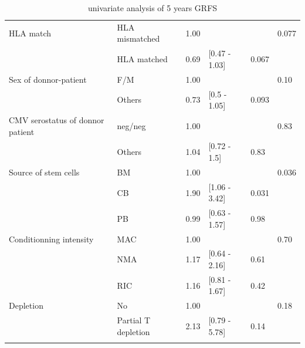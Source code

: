 \documentclass[a4paper,11pt] {article}
\begin{document}
\begin{center}
\begin{landscape}
\begin{longtable}{llrlll}
  HLA match & HLA mismatched & 1.00 &  &  & 0.077 \\ 
   & HLA matched & 0.69 & [0.47 - 1.03] & 0.067 &  \\ 
  Sex of donnor-patient & F/M & 1.00 &  &  & 0.10 \\ 
   & Others & 0.73 & [0.5 - 1.05] & 0.093 &  \\ 
  CMV serostatus of donnor patient & neg/neg & 1.00 &  &  & 0.83 \\ 
   & Others & 1.04 & [0.72 - 1.5] & 0.83 &  \\ 
  Source of stem cells & BM & 1.00 &  &  & 0.036 \\ 
   & CB & 1.90 & [1.06 - 3.42] & 0.031 &  \\ 
   & PB & 0.99 & [0.63 - 1.57] & 0.98 &  \\ 
  Conditionning intensity & MAC & 1.00 &  &  & 0.70 \\ 
   & NMA & 1.17 & [0.64 - 2.16] & 0.61 &  \\ 
   & RIC & 1.16 & [0.81 - 1.67] & 0.42 &  \\ 
  Depletion & No & 1.00 &  &  & 0.18 \\ 
   & Partial T depletion & 2.13 & [0.79 - 5.78] & 0.14 &  \\ 
   \hline
\hline
\caption{univariate analysis of 5 years GRFS} 
\label{tab:uos}
\end{longtable}

\end{landscape}



\end{center}
\end{document}
